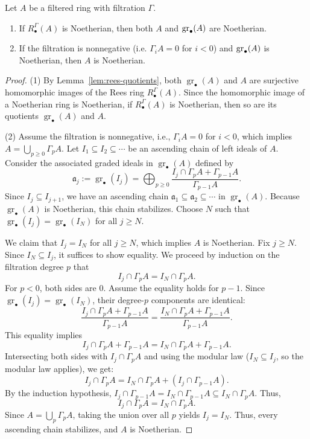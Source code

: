 \begin{proposition}\label{prop:noeth}
    Let $A$ be a filtered ring with filtration $\Gamma$.
    \begin{enumerate}
        \item If $R^{\Gamma}_\bullet (A)$ is Noetherian, then both $A$ and $\operatorname{gr}_\bullet (A)$ are Noetherian.
        \item If the filtration is nonnegative (i.e. $\Gamma_iA=0$ for $i<0$) and
              $\operatorname{gr}_\bullet (A)$ is Noetherian, then $A$ is Noetherian.
    \end{enumerate}
\end{proposition}
\begin{proof}
    (1) By Lemma~\ref{lem:rees-quotients}, both $\operatorname{gr}_\bullet (A)$ and $A$ are surjective homomorphic images of the Rees ring $R^{\Gamma}_\bullet (A)$. Since the homomorphic image of a Noetherian ring is Noetherian, if $R^{\Gamma}_\bullet (A)$ is Noetherian, then so are its quotients $\operatorname{gr}_\bullet (A)$ and $A$.

    (2) Assume the filtration is nonnegative, i.e., $\Gamma_i A = 0$ for $i < 0$, which implies $A = \bigcup_{p \ge 0} \Gamma_p A$.
    Let $I_1 \subseteq I_2 \subseteq \cdots$ be an ascending chain of left ideals of $A$.
    Consider the associated graded ideals in $\operatorname{gr}_\bullet (A)$ defined by
    \[
        \mathfrak{a}_j := \operatorname{gr}_\bullet(I_j) = \bigoplus_{p \ge 0} \frac{I_j \cap \Gamma_p A + \Gamma_{p-1} A}{\Gamma_{p-1} A}.
    \]
    Since $I_j \subseteq I_{j+1}$, we have an ascending chain $\mathfrak{a}_1 \subseteq \mathfrak{a}_2 \subseteq \cdots$ in $\operatorname{gr}_\bullet (A)$.
    Because $\operatorname{gr}_\bullet (A)$ is Noetherian, this chain stabilizes. Choose $N$ such that $\operatorname{gr}_\bullet(I_j) = \operatorname{gr}_\bullet(I_N)$ for all $j \ge N$.

    We claim that $I_j = I_N$ for all $j \ge N$, which implies $A$ is Noetherian.
    Fix $j \ge N$. Since $I_N \subseteq I_j$, it suffices to show equality. We proceed by induction on the filtration degree $p$ that
    \[
        I_j \cap \Gamma_p A = I_N \cap \Gamma_p A.
    \]
    For $p < 0$, both sides are $0$. Assume the equality holds for $p-1$.
    Since $\operatorname{gr}_\bullet(I_j) = \operatorname{gr}_\bullet(I_N)$, their degree-$p$ components are identical:
    \[
        \frac{I_j \cap \Gamma_p A + \Gamma_{p-1} A}{\Gamma_{p-1} A} = \frac{I_N \cap \Gamma_p A + \Gamma_{p-1} A}{\Gamma_{p-1} A}.
    \]
    This equality implies
    \[
        I_j \cap \Gamma_p A + \Gamma_{p-1} A = I_N \cap \Gamma_p A + \Gamma_{p-1} A.
    \]
    Intersecting both sides with $I_j \cap \Gamma_p A$ and using the modular law ($I_N \subseteq I_j$, so the modular law applies), we get:
    \[
        I_j \cap \Gamma_p A = I_N \cap \Gamma_p A + (I_j \cap \Gamma_{p-1} A).
    \]
    By the induction hypothesis, $I_j \cap \Gamma_{p-1} A = I_N \cap \Gamma_{p-1} A \subseteq I_N \cap \Gamma_p A$. Thus,
    \[
        I_j \cap \Gamma_p A = I_N \cap \Gamma_p A.
    \]
    Since $A = \bigcup_{p} \Gamma_p A$, taking the union over all $p$ yields $I_j = I_N$.
    Thus, every ascending chain stabilizes, and $A$ is Noetherian.
\end{proof}

